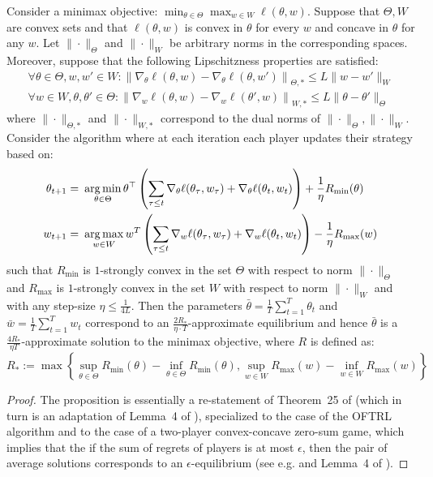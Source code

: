 \begin{proposition}\label{prop:appendix-minimax}
Consider a minimax objective: $\min_{\theta\in \Theta} \max_{w\in W} \ell(\theta, w)$. Suppose that $\Theta, W$ are convex sets and that $\ell(\theta, w)$ is convex in $\theta$ for every $w$ and concave in $\theta$ for any $w$. Let $\|\cdot\|_\Theta$ and $\|\cdot\|_W$ be arbitrary norms in the corresponding spaces. Moreover, suppose that the following Lipschitzness properties are satisfied:
\begin{align}
    \forall \theta\in \Theta, w, w'\in W: \left\|\nabla_{\theta}\ell(\theta, w)  - \nabla_{\theta}\ell(\theta, w')\right\|_{\Theta, *} \leq L \|w-w'\|_W\\
    \forall w\in W, \theta, \theta'\in \Theta: \left\|\nabla_{w}\ell(\theta, w)  - \nabla_{w}\ell(\theta', w)\right\|_{W, *} \leq L \|\theta-\theta'\|_\Theta
\end{align}
where $\|\cdot\|_{\Theta, *}$ and $\|\cdot\|_{W, *}$ correspond to the dual norms of $\|\cdot\|_{\Theta}, \|\cdot\|_W$. Consider the algorithm where at each iteration each player updates their strategy based on:
\begin{align}
    \theta_{t+1} =~& \operatorname*{arg\,min}_{\theta\in \Theta} \theta^\top \left(\sum_{\tau\leq t} \nabla_{\theta}\ell(\theta_\tau, w_\tau) + \nabla_{\theta} \ell(\theta_t, w_t)\right) + \frac{1}{\eta} R_{\min}(\theta)\\
    w_{t+1} =~& \operatorname*{arg\,max}_{w\in W} w^T \left(\sum_{\tau \leq t} \nabla_{w} \ell(\theta_\tau, w_\tau) + \nabla_w \ell(\theta_t, w_t)\right) - \frac{1}{\eta} R_{\max}(w)
\end{align}
such that $R_{\min}$ is $1$-strongly convex in the set $\Theta$ with respect to norm $\|\cdot\|_\Theta$ and $R_{\max}$ is $1$-strongly convex in the set $W$ with respect to norm $\|\cdot\|_W$ and with any step-size $\eta \leq \frac{1}{4L}$. Then the parameters $\bar{\theta} = \frac{1}{T} \sum_{t=1}^T \theta_t$ and $\bar{w}=\frac{1}{T}\sum_{t=1}^T w_t$ correspond to an $\frac{2 R_*}{\eta \cdot T}$-approximate equilibrium and hence $\bar{\theta}$ is a $\frac{4 R_*}{\eta T}$-approximate solution to the minimax objective, where $R$ is defined as:
\begin{equation}
    R_* := \max\left\{ \sup_{\theta\in \Theta} R_{\min}(\theta) - \inf_{\theta\in \Theta} R_{\min}(\theta), \sup_{w\in W} R_{\max}(w)-\inf_{w\in W} R_{\max}(w)\right\}
\end{equation}
\end{proposition}
\begin{proof}
The proposition is essentially a re-statement of Theorem~25 of \cite{syrgkanis2015fast} (which in turn is an adaptation of Lemma~4 of \cite{Rakhlin2013}), specialized to the case of the OFTRL algorithm and to the case of a two-player convex-concave zero-sum game, which implies that the if the sum of regrets of players is at most $\epsilon$, then the pair of average solutions corresponds to an $\epsilon$-equilibrium (see e.g. \cite{FREUND199979} and Lemma~4 of \cite{Rakhlin2013}).
\end{proof}

